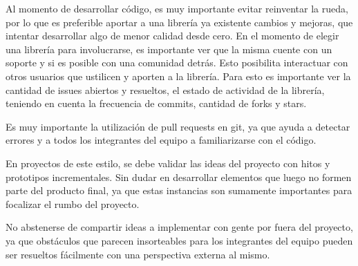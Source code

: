 Al momento de desarrollar código, es muy importante evitar reinventar la rueda, por lo que es preferible aportar a una librería ya existente cambios y mejoras, que intentar desarrollar algo de menor calidad desde cero. En el momento de elegir una librería para involucrarse, es importante ver que la misma cuente con un soporte y si es posible con una comunidad detrás. Esto posibilita interactuar con otros usuarios que ustilicen y aporten a la librería. Para esto es importante ver la cantidad de issues abiertos y resueltos, el estado de actividad de la librería, teniendo en cuenta la frecuencia de commits, cantidad de forks y stars.

Es muy importante la utilización de pull requests en git, ya que ayuda a detectar errores y a todos los integrantes del equipo a familiarizarse con el código.

En proyectos de este estilo, se debe validar las ideas del proyecto con hitos y prototipos incrementales. Sin dudar en desarrollar elementos que luego no formen parte del producto final, ya que estas instancias son sumamente importantes para focalizar el rumbo del proyecto.

No abstenerse de compartir ideas a implementar con gente por fuera del proyecto, ya que obstáculos que parecen insorteables para los integrantes del equipo pueden ser resueltos fácilmente con una perspectiva externa al mismo.
